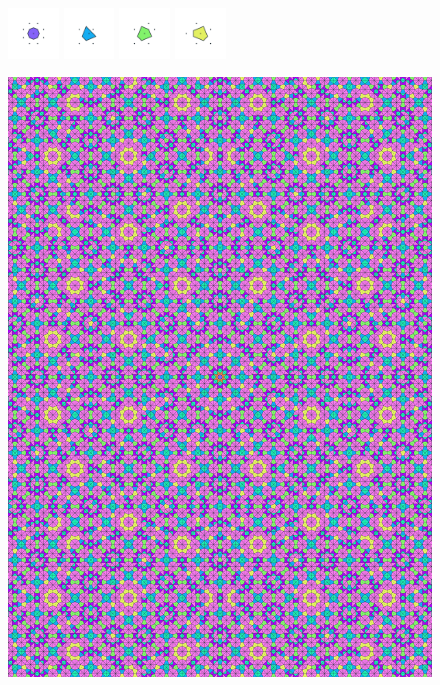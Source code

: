 \documentclass[text.tex]{subfiles}
\begin{document}
\begin{figure}[h!]
\includegraphics[width=0.12\textwidth]{img/results/circle8/circle8_184776_(-312_130alpha_1)_005.pdf}
\includegraphics[width=0.12\textwidth]{img/results/circle8/circle8_184776_(-312_130alpha_1)_006.pdf}
\includegraphics[width=0.12\textwidth]{img/results/circle8/circle8_184776_(-312_130alpha_1)_007.pdf}
\includegraphics[width=0.12\textwidth]{img/results/circle8/circle8_184776_(-312_130alpha_1)_008.pdf}
\end{figure}

\begin{figure}[h!]
\centering
\includegraphics[width=1\textwidth]{img/results/circle8/quasi_circle_184776_(-312_130alpha_1).pdf}
\end{figure}
\end{document}
